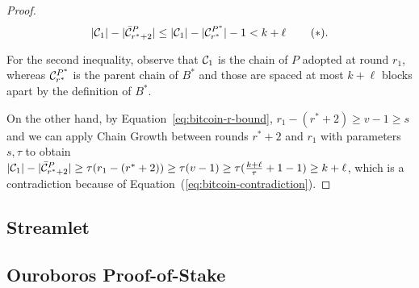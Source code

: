 \begin{proof}

  \[
     |\mathcal{C}_1| - |\bar {\mathcal{C}}^P_{r^* + 2}| \leq
     |\mathcal{C}_1| - |\mathcal{C}^{P^*}_{r^*}| - 1 <
     k + \ell\, \label{eq:bitcoin-contradiction}\tag{$\ast$}.
  \]

  For the second inequality, observe that
  $\mathcal{C}_1$ is the chain of $P$ adopted at round $r_1$,
  whereas $\mathcal{C}^{P^*}_{r^*}$ is
  the parent chain of $B^*$ and those are spaced at most $k + \ell$ blocks
  apart by the definition of $B^*$.

  On the other hand, by Equation~\ref{eq:bitcoin-r-bound}, $r_1 - (r^* + 2) \geq v - 1 \geq s$ and
  we can apply Chain Growth between rounds $r^* + 2$ and $r_1$
  with parameters $s, \tau$ to obtain
  $|\mathcal{C}_1| - |\bar {\mathcal{C}}^P_{r^* + 2}| \geq \tau(r_1 - (r^* + 2)) \geq \tau (v - 1) \geq
  \tau (\frac{k + \ell}{\tau} + 1 - 1) \geq k + \ell$,
  which is a contradiction because of Equation~(\ref{eq:bitcoin-contradiction}).

  \Qed
\end{proof}

\subsection{Streamlet}


\subsection{Ouroboros Proof-of-Stake}

